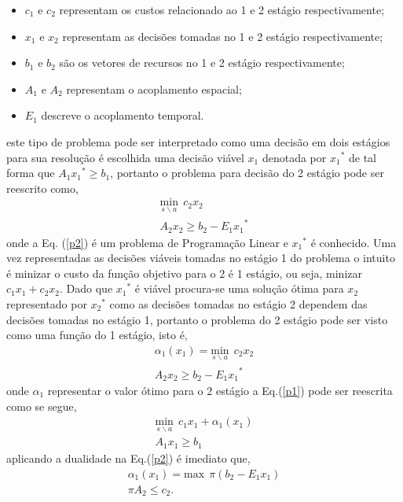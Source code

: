 \documentclass[12pt,fleqn]{article}
\begin{document}
\begin{itemize}
  \item $c_1$ e $c_2$ representam os custos relacionado ao 1 e 2 est\'agio respectivamente;
  \item $x_1$ e $x_2$ representam as decis\~oes tomadas no 1 e 2 est\'agio respectivamente;
  \item $b_1$ e $b_2$  s\~ao os vetores de recursos no 1 e 2 est\'agio respectivamente; 
  \item $A_1$ e $A_2$ representam o acoplamento espacial;
  \item $E_1$ descreve o acoplamento temporal.
\end{itemize}
este tipo de problema pode ser interpretado como uma decis\~ao em dois est\'agios para sua resolu\c c\~ao \'e
escolhida uma decis\~ao vi\'avel $x_1$ denotada por ${x_1}^{*}$ de tal forma que $A_1{x_1}^{*} \geq b_1$, 
portanto o problema para decis\~ao do 2 est\'agio pode ser reescrito como, 
\begin{equation}
  \begin{aligned}
	\underset {s \backslash a} {\text {min}} \ \ c_2x_2  \\
	A_2 x_2 \geq b_2 - 	{E_1 x_1}^{*}  
  \end{aligned}
  \label{p2}
\end{equation}
onde a Eq. (\ref {p2}) \'e um problema de Programa\c c\~ao Linear e ${x_1}^{*}$ \'e conhecido. Uma vez representadas as decis\~oes vi\'aveis tomadas no est\'agio 1 do
problema o intuito \'e minizar o custo da fun\c c\~ao objetivo para o 2 \'e 1 est\'agio, ou seja, minizar
$c_1x_1 + c_2x_2$. Dado que ${x_1}^{*}$ \'e vi\'avel procura-se uma solu\c c\~ao \'otima para $x_2$ representado por
${x_2}^{*}$ como as decis\~oes tomadas no est\'agio 2 dependem das decis\~oes tomadas no est\'agio 1, portanto o
problema do 2 est\'agio pode ser visto como uma fun\c c\~ao do 1 est\'agio, isto \'e,
\begin{equation}
  \begin{aligned}
	{\alpha}_{1} (x_1) = \underset {s \backslash a} { \text {min}} \ \ c_2x_2  \\
	A_2 x_2 \geq b_2 - 	{E_1 x_1}^{*}  
  \end{aligned}
  \label{p3}
\end{equation}
onde ${\alpha}_{1}$ representar o valor \'otimo para o 2 est\'agio a Eq.(\ref{p1}) pode ser reescrita como se segue,
\begin{equation*}
  \begin{aligned}
	\underset {s \backslash a} { \text{min}} \ \ c_1x_1 + {\alpha}_{1}(x_1) \\
	A_1x_1 \geq b_1
  \end{aligned}
\end{equation*}
aplicando a dualidade na Eq.(\ref{p2}) \'e imediato que,
\begin{equation}
  \begin{aligned}
	{\alpha}_{1}(x_1) = \text {max} \ \ \pi (b_2 - E_1x_1 ) \\
	\pi A_2  \leq c_2.
  \end{aligned}
	\label{p4}
\end{equation}
\end{document}
